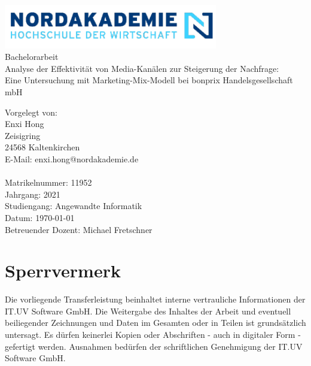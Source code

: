 \documentclass{common/nak}
\numberwithin{equation}{subsection}
\begin{document}
\hspace{3cm}
\begin{center}
    \includegraphics[width=0.7\textwidth]{images/nak_logo2.png}\\
     \huge { Bachelorarbeit \\[1em]
     \large{Analyse der Effektivität von Media-Kanälen zur Steigerung der Nachfrage:
     \\ Eine Untersuchung mit Marketing-Mix-Modell bei bonprix Handelsgesellschaft mbH
}}
\end{center}

\vspace*{\fill}


\noindent Vorgelegt von:\\
Enxi Hong \\
Zeisigring \\
24568 Kaltenkirchen\\
E-Mail: enxi.hong@nordakademie.de\\
\\
Matrikelnummer: 11952\\
Jahrgang: 2021\\
Studiengang: Angewandte Informatik\\
Datum: \today\\
Betreuender Dozent: Michael Fretschner\\

\newpage

\newpage
\section*{Sperrvermerk}

Die vorliegende Transferleistung beinhaltet interne vertrauliche Informationen der IT.UV Software GmbH. Die Weitergabe des Inhaltes der Arbeit und eventuell beiliegender Zeichnungen und Daten im Gesamten oder in Teilen ist grundsätzlich untersagt. Es dürfen keinerlei Kopien oder Abschriften - auch in digitaler Form - gefertigt werden. Ausnahmen bedürfen der schriftlichen Genehmigung der IT.UV Software GmbH.
\end{document}
